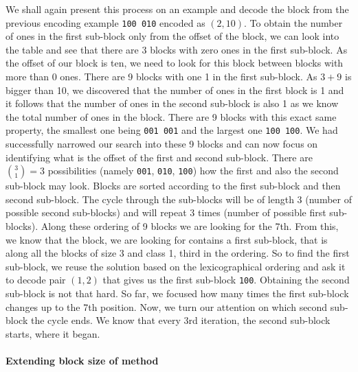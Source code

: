We shall again present this process on an example and decode the block from the previous
encoding example {\tt 100 010} encoded as $(2, 10)$. To obtain the number of ones in
the first sub-block only from the offset of the block, we can look into the table and
see that there are 3 blocks with zero ones in the first sub-block. As the offset of our
block is ten, we need to look for this block between blocks with more than 0 ones. There
are 9 blocks with one 1 in the first sub-block. As $3+9$ is bigger than 10, we discovered
that the number of ones in the first block is 1 and it follows that the number of ones in
the second sub-block is
also 1 as we know the total number of ones in the block. There are 9 blocks with
this exact same property, the smallest one being {\tt 001 001} and the largest one
{\tt 100 100}. We had successfully narrowed our search into these 9 blocks and can now
focus on identifying what is the offset of the first and second sub-block. There are
${3 \choose 1} = 3$ possibilities (namely {\tt 001}, {\tt 010}, {\tt 100}) how the first
and also the second sub-block may look. Blocks are sorted according
to the first sub-block and then second sub-block. The cycle through
the sub-blocks will be of length 3 (number of possible second sub-blocks) and will repeat
3 times (number of possible first sub-blocks). Along these ordering of 9 blocks we are
looking for the 7th. From this, we know that the block, we are looking for contains a
first sub-block, that is along all the blocks of size 3 and class 1, third in the ordering.
So to find the first sub-block, we reuse the solution based on the lexicographical ordering
and ask it to decode pair $(1, 2)$ that gives us the first sub-block {\tt 100}. Obtaining
the second sub-block is not that hard. So far, we focused how many times the first sub-block
changes up to the 7th position. Now, we turn our attention on which second sub-block the cycle
ends. We know that every 3rd iteration, the second sub-block starts, where it began.

\paragraph{Extending block size of method}

